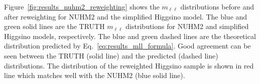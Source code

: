 
Figure~\ref{fig:results_nuhm2_reweighting} shows the $m_{\ell \ell}$ distributions before and after reweighting for NUHM2 and the simplified Higgsino model.
The blue and green solid lines are the TRUTH $m_{\ell \ell}$ distributions for NUHM2 and simplified Higgsino models, respectively.
The blue and green dashed lines are the theoretical distribution predicted by Eq.~\ref{eq:results_mll_formula}.
Good agreement can be seen between the TRUTH (solid line) and the predicted (dashed line) distributions.
The distribution of the reweighted Higgsino sample is shown in red line which matches well with the NUHM2 (blue solid line).

